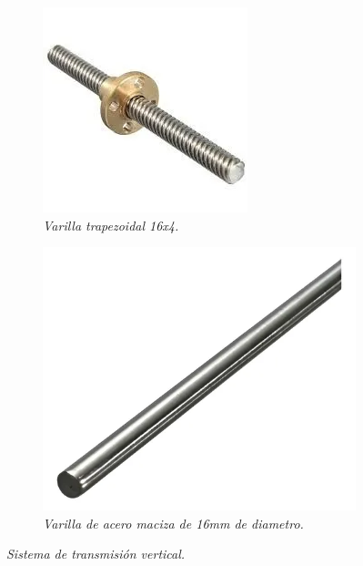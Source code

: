 \begin{figure}[H]
    \centering
    \begin{subfigure}{0.3\textwidth}
        \centering
        \includegraphics[width=\textwidth]{img/v_roscada.png}
        \caption{\textit{Varilla trapezoidal 16x4.}}
        \label{fig:v_roscada}
    \end{subfigure}
    \hfill
    \begin{subfigure}{0.3\textwidth}
        \centering
        \includegraphics[width=\textwidth]{img/varilla lisa.png}
        \caption{\textit{Varilla de acero maciza de 16mm de diametro.}}
        \label{fig:varilla lisa}
    \end{subfigure}
    \caption{\textit{Sistema de transmisión vertical.}}
\end{figure}


